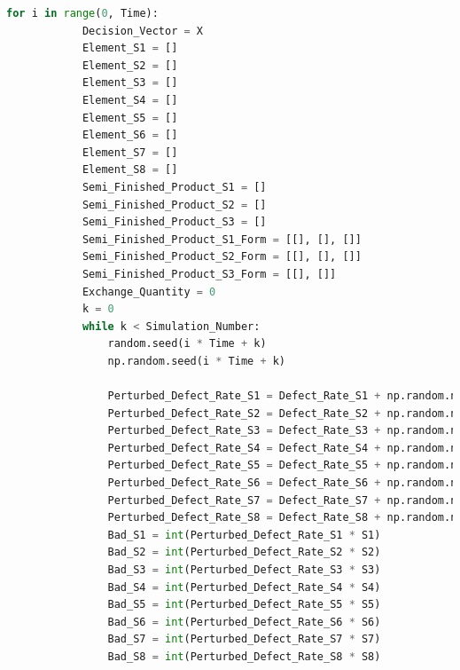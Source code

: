 \documentclass[withoutpreface,bwprint]{cumcmthesis} %
\begin{document}
\begin{appendices}
\begin{lstlisting}[language=python]
		for i in range(0, Time):
			Decision_Vector = X
			Element_S1 = []
			Element_S2 = []
			Element_S3 = []
			Element_S4 = []
			Element_S5 = []
			Element_S6 = []
			Element_S7 = []
			Element_S8 = []
			Semi_Finished_Product_S1 = []
			Semi_Finished_Product_S2 = []
			Semi_Finished_Product_S3 = []
			Semi_Finished_Product_S1_Form = [[], [], []]
			Semi_Finished_Product_S2_Form = [[], [], []]
			Semi_Finished_Product_S3_Form = [[], []]
			Exchange_Quantity = 0
			k = 0
			while k < Simulation_Number:
				random.seed(i * Time + k)
				np.random.seed(i * Time + k)
	
				Perturbed_Defect_Rate_S1 = Defect_Rate_S1 + np.random.normal(0, 0.01)
				Perturbed_Defect_Rate_S2 = Defect_Rate_S2 + np.random.normal(0, 0.01)
				Perturbed_Defect_Rate_S3 = Defect_Rate_S3 + np.random.normal(0, 0.01)
				Perturbed_Defect_Rate_S4 = Defect_Rate_S4 + np.random.normal(0, 0.01)
				Perturbed_Defect_Rate_S5 = Defect_Rate_S5 + np.random.normal(0, 0.01)
				Perturbed_Defect_Rate_S6 = Defect_Rate_S6 + np.random.normal(0, 0.01)
				Perturbed_Defect_Rate_S7 = Defect_Rate_S7 + np.random.normal(0, 0.01)
				Perturbed_Defect_Rate_S8 = Defect_Rate_S8 + np.random.normal(0, 0.01)
				Bad_S1 = int(Perturbed_Defect_Rate_S1 * S1)
				Bad_S2 = int(Perturbed_Defect_Rate_S2 * S2)
				Bad_S3 = int(Perturbed_Defect_Rate_S3 * S3)
				Bad_S4 = int(Perturbed_Defect_Rate_S4 * S4)
				Bad_S5 = int(Perturbed_Defect_Rate_S5 * S5)
				Bad_S6 = int(Perturbed_Defect_Rate_S6 * S6)
				Bad_S7 = int(Perturbed_Defect_Rate_S7 * S7)
				Bad_S8 = int(Perturbed_Defect_Rate_S8 * S8)
	

\end{lstlisting}
\end{appendices}
\end{document}
